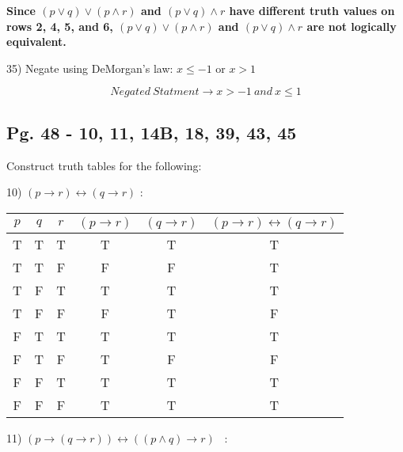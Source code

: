 \documentclass[11pt]{article}
\begin{document}
	\begin{flushleft}
	\textbf{Since $(p \lor q) \lor (p \land r)$ and $(p \lor q) \land r$ have different truth values on rows 2, 4, 5, and 6, $(p \lor q) \lor (p \land r)$ and $(p \lor q) \land r$ are not logically equivalent.}
	\break
	
	\hrulefill
	
	35) Negate using DeMorgan's law: $x \leq -1 $ or $x>1$
	
	$$Negated\ Statment \to x>-1 \ and\ x\leq 1$$
	
	\end{flushleft}
	
	\hrulefill
	
	
	
	\subsection{Pg. 48 - 10, 11, 14B, 18, 39, 43, 45}
	\begin{flushleft}
	Construct truth tables for the following: 
	
	10) $(p \to r) \leftrightarrow (q \to r)$	:
	\end{flushleft}
	
	\begin{center}
	\begin{tabular}{|c|c|c|c|c|c|}\hline
	$p$ & $q$ & $r$ & $(p \to r)$ & $(q \to r)$ & $(p \to r) \leftrightarrow (q \to r) $\\ \hline
	 T  &  T  &  T  &      T      &      T      &                   T                   \\ \hline
	 T  &  T  &  F  &      F      &      F      &                   T                   \\ \hline
	 T  &  F  &  T  &      T      &      T      &                   T                   \\ \hline
	 T  &  F  &  F  &      F      &      T      &                   F                   \\ \hline
	 F  &  T  &  T  &      T      &      T      &                   T                   \\ \hline
	 F  &  T  &  F  &      T      &      F      &                   F                   \\ \hline
	 F  &  F  &  T  &      T      &      T      &                   T                   \\ \hline
	 F  &  F  &  F  &      T      &      T      &                   T                   \\ \hline
	\end{tabular}
	\end{center}
	\hrulefill
	\begin{flushleft}
	11) $(p \to (q \to r)) \leftrightarrow ((p \land q) \to r)$	\	:
	\end{flushleft}
	
\end{document}
